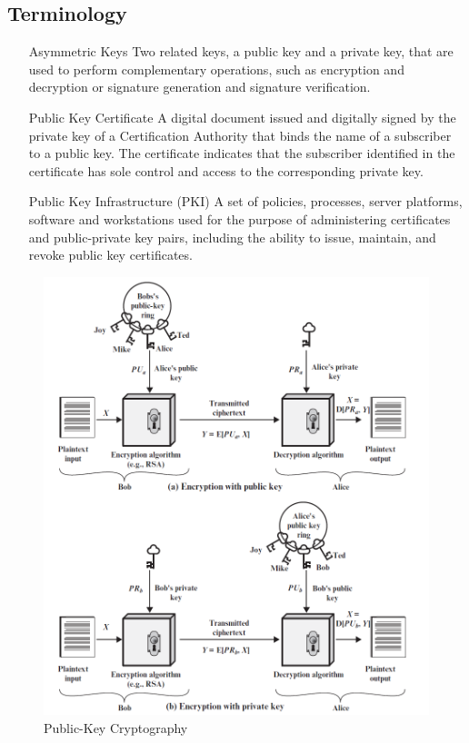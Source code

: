 \documentclass{article}
\begin{document}
\subsection{Terminology}
\begin{itemize}
    \item[Asymmetric Keys] Two related keys, a public key and a private key, that are used to perform complementary operations, such as encryption and decryption or signature generation and signature verification.
    \item[Public Key Certificate] A digital document issued and digitally signed by the private key of a Certification Authority that binds the name of a subscriber to a public key. The certificate indicates that the subscriber identified in the certificate has sole control and access to the corresponding private key.
    \item[Public Key Infrastructure (PKI)] A set of policies, processes, server platforms, software and workstations used for the purpose of administering certificates and public-private key pairs, including the ability to issue, maintain, and revoke public key certificates.
\end{itemize}

\begin{figure}[h]
    \centering
    \includegraphics[width=\textwidth]{publickey.png}
    \caption{Public-Key Cryptography \cite{pubkey}}
    \label{fig:pubkey}
\end{figure}
\end{document}
